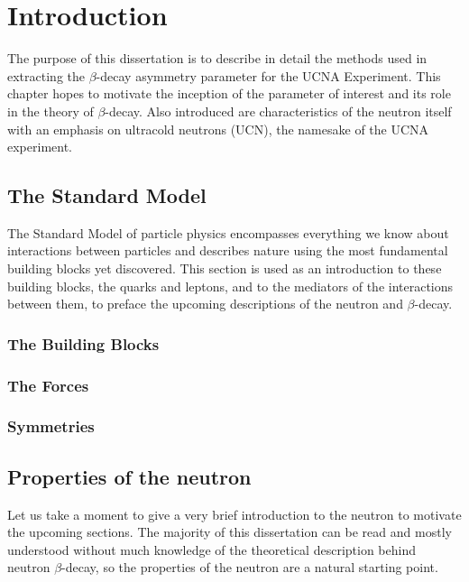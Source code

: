 \chapter{Introduction}
\label{ch:Introduction}

The purpose of this dissertation is to describe in detail
the methods used in extracting the $\beta$-decay asymmetry parameter
for the UCNA Experiment. This chapter hopes to motivate the inception
of the parameter of interest and its role in the theory of $\beta$-decay.
Also introduced are characteristics of the neutron itself with an
emphasis on ultracold neutrons (UCN), the namesake of the UCNA experiment.


\section{The Standard Model}
The Standard Model of particle physics encompasses everything we know about
interactions between particles and describes nature using the most fundamental
building blocks yet discovered. This section is used as an introduction
to these building blocks, the quarks and leptons, and to the mediators of the
interactions between them, to preface the upcoming descriptions of the neutron
and $\beta$-decay.

\subsection{The Building Blocks}

\subsection{The Forces}

\subsection{Symmetries}




\section{Properties of the neutron}
\label{sec:neutronProperties}
Let us take a moment to give a very brief introduction to the neutron to motivate the
upcoming sections. The majority of this dissertation can be read and mostly understood
without much knowledge of the theoretical description behind neutron $\beta$-decay,
so the properties of the neutron are a natural starting point.

